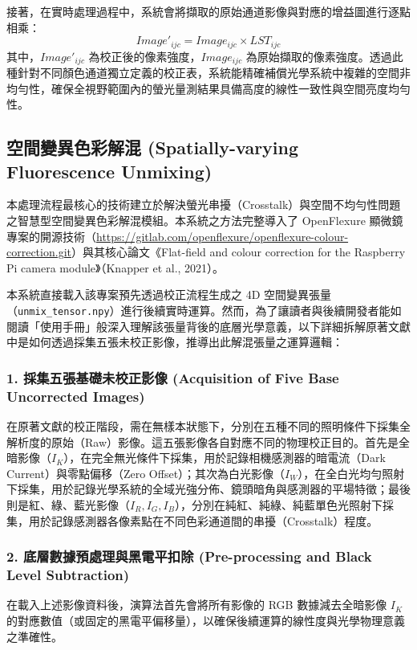 接著，在實時處理過程中，系統會將擷取的原始通道影像與對應的增益圖進行逐點相乘：
\begin{equation}
    Image'_{ijc} = Image_{ijc} \times LST_{ijc}
\end{equation}
其中，$Image'_{ijc}$ 為校正後的像素強度，$Image_{ijc}$ 為原始擷取的像素強度。透過此種針對不同顏色通道獨立定義的校正表，系統能精確補償光學系統中複雜的空間非均勻性，確保全視野範圍內的螢光量測結果具備高度的線性一致性與空間亮度均勻性。

\subsection{空間變異色彩解混 (Spatially-varying Fluorescence Unmixing)}

本處理流程最核心的技術建立於解決螢光串擾（Crosstalk）與空間不均勻性問題之智慧型空間變異色彩解混模組。本系統之方法完整導入了 OpenFlexure 顯微鏡專案的開源技術（\url{https://gitlab.com/openflexure/openflexure-colour-correction.git}）與其核心論文《Flat-field and colour correction for the Raspberry Pi camera module》（Knapper et al., 2021）。

本系統直接載入該專案預先透過校正流程生成之 4D 空間變異張量（\texttt{unmix\_tensor.npy}）進行後續實時運算。然而，為了讓讀者與後續開發者能如閱讀「使用手冊」般深入理解該張量背後的底層光學意義，以下詳細拆解原著文獻中是如何透過採集五張未校正影像，推導出此解混張量之運算邏輯：

\subsubsection*{1. 採集五張基礎未校正影像 (Acquisition of Five Base Uncorrected Images)}
在原著文獻的校正階段，需在無樣本狀態下，分別在五種不同的照明條件下採集全解析度的原始（Raw）影像。這五張影像各自對應不同的物理校正目的。首先是全暗影像（$I_K$），在完全無光條件下採集，用於記錄相機感測器的暗電流（Dark Current）與零點偏移（Zero Offset）；其次為白光影像（$I_W$），在全白光均勻照射下採集，用於記錄光學系統的全域光強分佈、鏡頭暗角與感測器的平場特徵；最後則是紅、綠、藍光影像（$I_R, I_G, I_B$），分別在純紅、純綠、純藍單色光照射下採集，用於記錄感測器各像素點在不同色彩通道間的串擾（Crosstalk）程度。

\subsubsection*{2. 底層數據預處理與黑電平扣除 (Pre-processing and Black Level Subtraction)}
在載入上述影像資料後，演算法首先會將所有影像的 RGB 數據減去全暗影像 $I_K$ 的對應數值（或固定的黑電平偏移量），以確保後續運算的線性度與光學物理意義之準確性。

